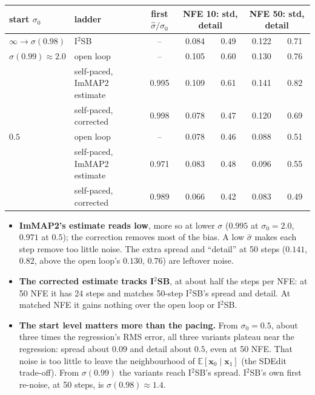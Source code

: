 \documentclass[11pt]{article}
\theoremstyle{remark}
\newcommand{\x}{\bm{x}}
\newcommand{\E}{\mathbb{E}}
\begin{document}
\begin{center}
\footnotesize
\begin{tabular}{@{}llccccc@{}}
\toprule
start $\sigma_0$ & ladder & first $\hat\sigma/\sigma_0$ & \multicolumn{2}{c}{NFE 10: std, detail}
  & \multicolumn{2}{c}{NFE 50: std, detail} \\
\midrule
$\infty\to\sigma(0.98)$ & I$^2$SB & -- & 0.084 & 0.49 & 0.122 & 0.71 \\
\addlinespace
$\sigma(0.99)\approx2.0$ & open loop & -- & 0.105 & 0.60 & 0.130 & 0.76 \\
 & self-paced, ImMAP2 estimate & 0.995 & 0.109 & 0.61 & 0.141 & 0.82 \\
 & self-paced, corrected & 0.998 & 0.078 & 0.47 & 0.120 & 0.69 \\
\addlinespace
$0.5$ & open loop & -- & 0.078 & 0.46 & 0.088 & 0.51 \\
 & self-paced, ImMAP2 estimate & 0.971 & 0.083 & 0.48 & 0.096 & 0.55 \\
 & self-paced, corrected & 0.989 & 0.066 & 0.42 & 0.083 & 0.49 \\
\bottomrule
\end{tabular}
\end{center}

\begin{itemize}[leftmargin=1.5em, itemsep=1pt]
  \item \textbf{ImMAP2's estimate reads low}, more so at lower $\sigma$ ($0.995$ at $\sigma_0=2.0$,
        $0.971$ at $0.5$); the correction removes most of the bias. A low $\hat\sigma$ makes each
        step remove too little noise. The extra spread and ``detail'' at 50 steps
        ($0.141$, $0.82$, above the open loop's $0.130$, $0.76$) are leftover noise.
  \item \textbf{The corrected estimate tracks I$^2$SB}, at about half the steps per NFE: at 50
        NFE it has 24 steps and matches 50-step I$^2$SB's spread and detail. At matched NFE it
        gains nothing over the open loop or I$^2$SB.
  \item \textbf{The start level matters more than the pacing.} From $\sigma_0=0.5$, about three
        times the regression's RMS error, all three variants plateau near the regression: spread
        about $0.09$ and detail about $0.5$, even at 50 NFE. That noise is too little to leave the
        neighbourhood of $\E[\x_0\mid\x_1]$ (the SDEdit trade-off). From $\sigma(0.99)$ the
        variants reach I$^2$SB's spread. I$^2$SB's own first re-noise, at 50 steps, is
        $\sigma(0.98)\approx1.4$.
\end{itemize}
\end{document}
